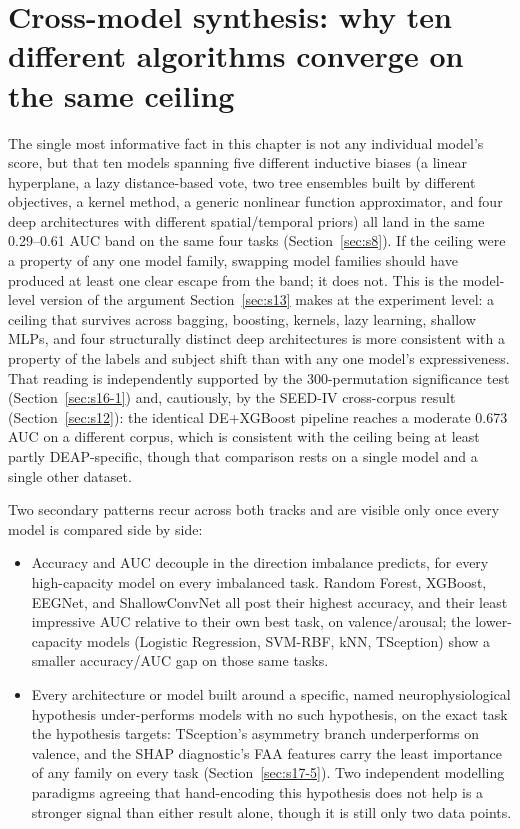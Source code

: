 \documentclass[11pt]{report}
\begin{document}
\section{Cross-model synthesis: why ten different algorithms converge on the
same ceiling}
\label{sec:ma-synthesis}
The single most informative fact in this chapter is not any individual
model's score, but that ten models spanning five different inductive biases
(a linear hyperplane, a lazy distance-based vote, two tree ensembles built
by different objectives, a kernel method, a generic nonlinear function
approximator, and four deep architectures with different spatial/temporal
priors) all land in the same 0.29--0.61 AUC band on the same four
tasks (Section~\ref{sec:s8}). If the ceiling were a property of any one
model family, swapping model families should have produced at least one
clear escape from the band; it does not. This is the model-level version of
the argument Section~\ref{sec:s13} makes at the experiment level: a ceiling
that survives across bagging, boosting, kernels, lazy learning, shallow
MLPs, and four structurally distinct deep architectures is more consistent
with a property of the labels and subject shift than with any one model's
expressiveness. That reading is independently supported by the
300-permutation significance test (Section~\ref{sec:s16-1}) and, cautiously,
by the SEED-IV cross-corpus result (Section~\ref{sec:s12}): the identical
DE+XGBoost pipeline reaches a moderate 0.673 AUC on a different corpus,
which is consistent with the ceiling being at least partly DEAP-specific,
though that comparison rests on a single model and a single other dataset.

Two secondary patterns recur across both tracks and are visible only once
every model is compared side by side:
\begin{itemize}
  \item Accuracy and AUC decouple in the direction imbalance predicts, for
        every high-capacity model on every imbalanced task. Random Forest,
        XGBoost, EEGNet, and ShallowConvNet all post their highest accuracy,
        and their least impressive AUC relative to their own best task, on
        valence/arousal; the lower-capacity models (Logistic Regression,
        SVM-RBF, kNN, TSception) show a smaller accuracy/AUC gap on those
        same tasks.
  \item Every architecture or model built around a specific, named
        neurophysiological hypothesis under-performs models with no such
        hypothesis, on the exact task the hypothesis targets: TSception's
        asymmetry branch underperforms on valence, and the SHAP
        diagnostic's FAA features carry the least importance of any family
        on every task (Section~\ref{sec:s17-5}). Two independent modelling
        paradigms agreeing that hand-encoding this hypothesis does not help
        is a stronger signal than either result alone, though it is still
        only two data points.
\end{itemize}
\end{document}
